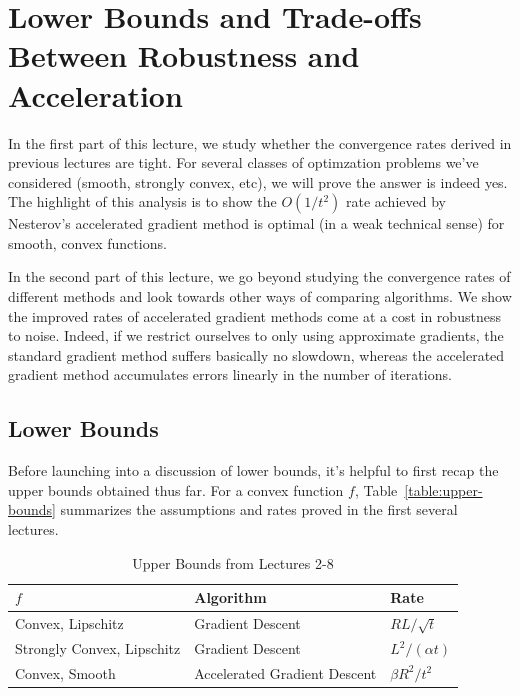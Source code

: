 \section{Lower Bounds and Trade-offs Between Robustness and Acceleration}

In the first part of this lecture, we study whether the convergence rates
derived in previous lectures are tight. For several classes of optimzation
problems we've considered (smooth, strongly convex, etc), we will prove the
answer is indeed yes. The highlight of this analysis is to show the $O(1/t^2)$
rate achieved by Nesterov's accelerated gradient method is optimal (in a weak
technical sense) for smooth, convex functions. 

In the second part of this lecture, we go beyond studying the convergence
rates of different methods and look towards other ways of comparing algorithms.
We show the improved rates of accelerated gradient methods
come at a cost in robustness to noise. Indeed, if we restrict ourselves to
only using approximate gradients, the standard gradient method suffers basically no
slowdown, whereas the accelerated gradient method accumulates errors linearly in
the number of iterations.

\subsection{Lower Bounds}
Before launching into a discussion of lower bounds, it's helpful to first recap
the upper bounds obtained thus far. For a convex function $f$,
Table~\eqref{table:upper-bounds} summarizes the assumptions and rates proved in
the first several lectures. 
~
\begin{table}[]
\centering
\caption{Upper Bounds from Lectures 2-8}
\label{table:upper-bounds}
\begin{tabular}{|l|l|l|}
\hline
$f$                        & Algorithm                    & Rate                                            \\ \hline
Convex, Lipschitz          & Gradient Descent             & $RL / \sqrt{t}$                               \\ \hline
Strongly Convex, Lipschitz & Gradient Descent             & $L^2 / (\alpha t)$                \\ \hline
Convex, Smooth             & Accelerated Gradient Descent & $\beta R^2 / t^2$ \\ \hline
\end{tabular}
\end{table}  

